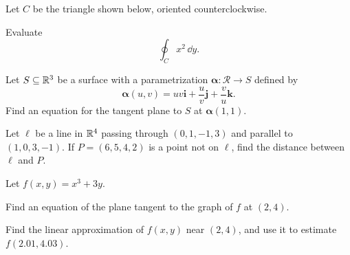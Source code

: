 \begin{problem}
Let $C$ be the triangle shown below, oriented counterclockwise.

\begin{center}
\end{center}

Evaluate
\[
\oint_C x^2\,\dd y.
\]
\end{problem}

\begin{problem}
Let $S\subseteq\mathbb{R}^3$ be a surface with a parametrization $\boldsymbol{\alpha}\colon\mathcal R\to S$ defined by
\[
\boldsymbol{\alpha}(u, v)
=uv\mathbf i+\frac{u}{v}\mathbf j+\frac{v}{u}\mathbf k.
\]
Find an equation for the tangent plane to $S$ at $\boldsymbol{\alpha}(1, 1)$.
\end{problem}

\begin{problem}
Let $\ell$ be a line in $\mathbb{R}^4$ passing through $(0, 1, -1, 3)$ and parallel to $(1, 0, 3, -1)$. If $P=(6, 5, 4, 2)$ is a point not on $\ell$, find the distance between $\ell$ and $P$.
\end{problem}

\begin{problem}
Let $f(x, y)=x^3+3y$.
\begin{problemsubparts}
\item Find an equation of the plane tangent to the graph of $f$ at $(2, 4)$.
\item Find the linear approximation of $f(x, y)$ near $(2, 4)$, and use it to estimate $f(2.01, 4.03)$.
\end{problemsubparts}
\end{problem}

